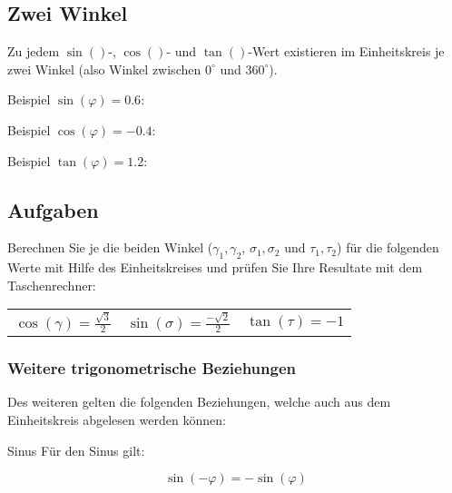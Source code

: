 \subsection{Zwei Winkel}
Zu jedem $\sin()$-, $\cos()$- und $\tan()$-Wert existieren im
Einheitskreis je zwei Winkel (also Winkel zwischen $0^{\circ{}}$ und
$360^{\circ{}}$).

Beispiel $\sin(\varphi) = 0.6$:

Beispiel $\cos(\varphi) = -0.4$:

Beispiel $\tan(\varphi) = 1.2$:


\newpage
\subsection*{Aufgaben}
Berechnen Sie je die beiden Winkel ($\gamma_1, \gamma_2$,
$\sigma_1, \sigma_2$ und $\tau_1, \tau_2$) für die folgenden Werte mit Hilfe des
Einheitskreises und prüfen Sie Ihre Resultate mit dem Taschenrechner:


\begin{tabular}{|c|c|c|}
  $\cos(\gamma)=\frac{\sqrt{3}}{2}$ & $\sin(\sigma) = \frac{-\sqrt{2}}{2}$ & $\tan(\tau) = -1$\\
\end{tabular}







\newpage


\subsubsection{Weitere trigonometrische Beziehungen}
Des weiteren gelten die folgenden Beziehungen, welche auch aus dem
Einheitskreis abgelesen werden können:
\begin{gesetz}{Sinus}{}
 Für den Sinus gilt:

  $$\sin(-\varphi) = - \sin(\varphi)$$
  \end{gesetz}

